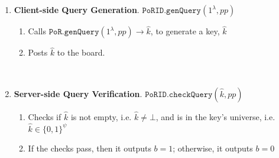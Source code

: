 \begin{enumerate}
 

 


\

\item\textbf{Client-side Query Generation}. $\mathtt{PoRID.genQuery}(1^{\lambda},  pp)$ 
\begin{enumerate}
\item Calls $\mathtt{PoR.genQuery}(1^{\lambda}, pp)\rightarrow \hat{k}$, to generate a key, $\hat{k}$ %
\item Posts $\hat{k}$ to the board. 
\end{enumerate}


\

\item\textbf{Server-side Query Verification}. $\mathtt{PoRID.checkQuery}(\hat{k}, pp)$
\begin{enumerate}
\item  Checks if  $\hat{k}$ is not empty, i.e. $\hat{k}\neq \bot$, and is in the key's universe, i.e. $\hat{k}\in \{0,1\}^{\scriptscriptstyle\psi}$%
\item  If the checks pass, then it outputs $b=1$; otherwise, it outputs $b=0$

\end{enumerate}
%


\end{enumerate}
